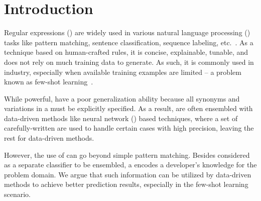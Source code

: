 \section{Introduction}


Regular expressions (\REs) are widely used in various natural language processing (\NLP) tasks like pattern matching, sentence
classification, sequence labeling, etc.~\cite{chang2014tokensregex}.
As a technique based on human-crafted rules, it is concise, explainable, tunable, and does not rely on much training data to generate. As
such, it is commonly used in industry, especially when available training examples are limited -- a problem known as few-shot
learning~\cite{gc2015big}.

While powerful, \REs have a poor generalization ability because all synonyms and variations in a \RE must be explicitly specified. As a
result, %
\REs are often ensembled  with data-driven methods like neural network (\NN) based techniques, where a set of carefully-written \REs are
used to handle certain cases with high precision, leaving the rest for data-driven methods.

However, the use of \REs can go beyond simple pattern matching.
Besides considered as a separate classifier to be ensembled,
a \RE {} encodes a developer's knowledge for the problem domain.  %
We argue that such information can be utilized by data-driven methods to achieve better prediction results, especially in the few-shot
learning scenario.




